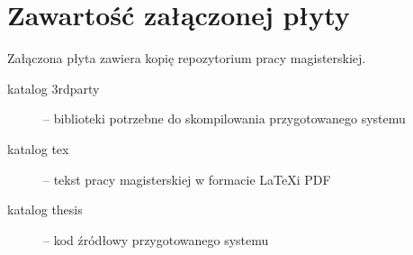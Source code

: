\chapter{Zawartość załączonej płyty}

Załączona płyta zawiera kopię repozytorium pracy magisterskiej.

\begin{description}

\item[katalog 3rdparty] --
biblioteki potrzebne do skompilowania przygotowanego systemu

\item[katalog tex] --
tekst pracy magisterskiej w formacie \LaTeX i PDF

\item[katalog thesis] --
kod źródłowy przygotowanego systemu


\end{description}